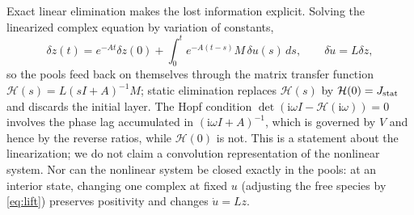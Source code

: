 \documentclass[11pt,a4paper]{article}
\theoremstyle{plain}
\theoremstyle{definition}
\theoremstyle{remark}
\newcommand{\ii}{\mathrm i}
\begin{document}
Exact linear elimination makes the lost information explicit. Solving the linearized complex equation by variation of constants,
\begin{equation}\label{eq:kernel}
 \delta z(t)=e^{-At}\delta z(0)+\int_0^te^{-A(t-s)}M\,\delta u(s)\,ds,\qquad
 \delta\dot u=L\delta z ,
\end{equation}
so the pools feed back on themselves through the matrix transfer function $\mathcal H(s)=L(sI+A)^{-1}M$; static elimination replaces $\mathcal H(s)$ by $\mathcal H(0)=J_{\rm stat}$ and discards the initial layer. The Hopf condition $\det(\ii\omega I-\mathcal H(\ii\omega))=0$ involves the phase lag accumulated in $(\ii\omega I+A)^{-1}$, which is governed by $V$ and hence by the reverse ratios, while $\mathcal H(0)$ is not. This is a statement about the linearization; we do not claim a convolution representation of the nonlinear system. Nor can the nonlinear system be closed exactly in the pools: at an interior state, changing one complex at fixed $u$ (adjusting the free species by \eqref{eq:lift}) preserves positivity and changes $\dot u=Lz$.
\end{document}
